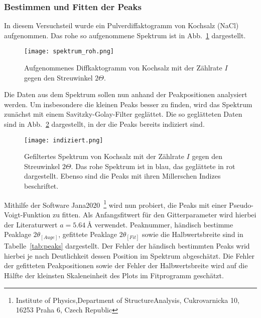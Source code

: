 \subsubsection{Bestimmen und Fitten der Peaks}
\label{sec:peaks}
In diesem Versuchsteil wurde ein Pulverdiffaktogramm von Kochsalz (NaCl) aufgenommen. Das rohe so aufgenommene Spektrum ist in Abb.~\ref{fig:rohspektrum} dargestellt.
\begin{figure}[h!]
    \centering
    \texttt{[image: spektrum\_roh.png]}
    \caption{Aufgenommenes Diffkaktogramm von Kochsalz mit der Zählrate $I$ gegen den Streuwinkel $2\Theta$.}
    \label{fig:rohspektrum}
\end{figure}

Die Daten aus dem Spektrum sollen nun anhand der Peakpositionen analysiert werden. 
Um insbesondere die kleinen Peaks besser zu finden, wird das Spektrum zunächst mit einem Savitzky-Golay-Filter geglättet. Die so geglätteten Daten sind in Abb.~\ref{fig:geglättet} dargestellt, in der die Peaks bereits indiziert sind.
\begin{figure}
    \centering
    \texttt{[image: indiziert.png]}
    \caption{Gefiltertes Spektrum von Kochsalz mit der Zählrate $I$ gegen den Streuwinkel $2\Theta$. Das rohe Spektrum ist in blau, das geglättete in rot dargestellt. Ebenso sind die Peaks mit ihren Millerschen Indizes beschriftet.}
    \label{fig:geglättet}
\end{figure}
Mithilfe der Software Jana2020~\footnote{Institute of Physics,Department of StructureAnalysis, Cukrovarnicka 10, 16253 Praha 6, Czech Republic} wird nun probiert, die Peaks mit einer Pseudo-Voigt-Funktion zu fitten. Als Anfangsfitwert für den Gitterparameter wird hierbei der Literaturwert $a = \SI{5,64}[]{\angstrom}$ verwendet. Peaknummer, händisch bestimme Peaklage $2\theta_{[Auge]}$, gefittete Peaklage $2\theta_{[Fit]}$ sowie die Halbwertsbreite sind in Tabelle~\ref{tab:peaks} dargestellt.
Der Fehler der händisch bestimmten Peaks wrid hierbei je nach Deutlichkeit dessen Position im Spektrum abgeschätzt. Die Fehler der gefitteten Peakpositionen sowie der Fehler der Halbwertsbreite wird auf die Hälfte der kleinsten Skaleneinheit des Plots im Fitprogramm geschätzt.



